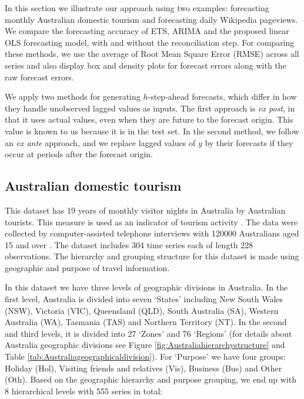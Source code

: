 \documentclass[11pt,a4paper,]{article}
\begin{document}
In this section we illustrate our approach using two examples: forecasting monthly Australian domestic tourism and forecasting daily Wikipedia pageviews. We compare the forecasting accuracy of ETS, ARIMA and the proposed linear OLS forecasting model, with and without the reconciliation step. For comparing these methods, we use the average of Root Mean Square Error (RMSE) across all series and also display box and density plots for forecast errors along with the raw forecast errors.

We apply two methods for generating \(h\)-step-ahead forecasts, which differ in how they handle unobserved lagged values as inputs. The first approach is \emph{ex post}, in that it uses actual values, even when they are future to the forecast origin. This value is known to us because it is in the test set. In the second method, we follow an \emph{ex ante} approach, and we replace lagged values of \(y\) by their forecasts if they occur at periods after the forecast origin.

\hypertarget{australian-domestic-tourism}{%
\subsection{Australian domestic tourism}\label{australian-domestic-tourism}}

This dataset has 19 years of monthly visitor nights in Australia by Australian tourists. This measure is used as an indicator of tourism activity \autocite{mint2018}. The data were collected by computer-assisted telephone interviews with 120000 Australians aged 15 and over \autocite{researchAustralia2005}. The dataset includes 304 time series each of length 228 observations. The hierarchy and grouping structure for this dataset is made using geographic and purpose of travel information.

In this dataset we have three levels of geographic divisions in Australia. In the first level, Australia is divided into seven `States' including New South Wales (NSW), Victoria (VIC), Queensland (QLD), South Australia (SA), Western Australia (WA), Tasmania (TAS) and Northern Territory (NT). In the second and third levels, it is divided into 27 `Zones' and 76 `Regions' (for details about Australia geographic divisions see Figure \ref{fig:Australiahierarchystructure} and Table \ref{tab:Australiageographicaldivision}). For `Purpose' we have four groups: Holiday (Hol), Visiting friends and relatives (Vis), Business (Bus) and Other (Oth). Based on the geographic hierarchy and purpose grouping, we end up with 8 hierarchical levels with 555 series in total:
\end{document}
